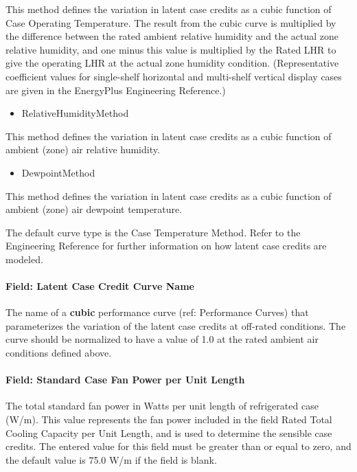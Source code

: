 This method defines the variation in latent case credits as a cubic function of Case Operating Temperature. The result from the cubic curve is multiplied by the difference between the rated ambient relative humidity and the actual zone relative humidity, and one minus this value is multiplied by the Rated LHR to give the operating LHR at the actual zone humidity condition. (Representative coefficient values for single-shelf horizontal and multi-shelf vertical display cases are given in the EnergyPlus Engineering Reference.)

\begin{itemize}
\tightlist
\item
  RelativeHumidityMethod
\end{itemize}

This method defines the variation in latent case credits as a cubic function of ambient (zone) air relative humidity.

\begin{itemize}
\tightlist
\item
  DewpointMethod
\end{itemize}

This method defines the variation in latent case credits as a cubic function of ambient (zone) air dewpoint temperature.

The default curve type is the Case Temperature Method. Refer to the Engineering Reference for further information on how latent case credits are modeled.

\paragraph{Field: Latent Case Credit Curve Name}\label{field-latent-case-credit-curve-name}

The name of a \textbf{cubic} performance curve (ref: Performance Curves) that parameterizes the variation of the latent case credits at off-rated conditions. The curve should be normalized to have a value of 1.0 at the rated ambient air conditions defined above.

\paragraph{Field: Standard Case Fan Power per Unit Length}\label{field-standard-case-fan-power-per-unit-length}

The total standard fan power in Watts per unit length of refrigerated case (W/m). This value represents the fan power included in the field Rated Total Cooling Capacity per Unit Length, and is used to determine the sensible case credits. The entered value for this field must be greater than or equal to zero, and the default value is 75.0 W/m if the field is blank.


